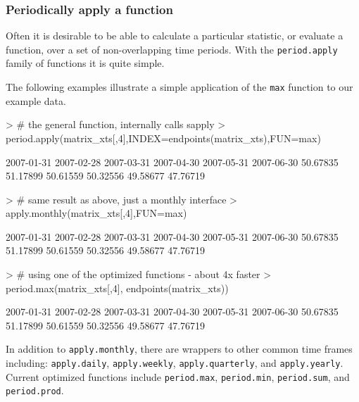 \documentclass{article}
\begin{document}
\subsubsection*{Periodically apply a function}
Often it is desirable to be able to calculate a
particular statistic, or evaluate a function, over
a set of non-overlapping time periods. With the
{\tt period.apply} family of functions
it is quite simple.

The following examples illustrate a
simple application of the {\tt max} function
to our example data.
\begin{Schunk}
\begin{Sinput}
> # the general function, internally calls sapply
> period.apply(matrix_xts[,4],INDEX=endpoints(matrix_xts),FUN=max)
\end{Sinput}
\begin{Soutput}
2007-01-31 2007-02-28 2007-03-31 2007-04-30 2007-05-31 2007-06-30 
  50.67835   51.17899   50.61559   50.32556   49.58677   47.76719 
\end{Soutput}
\end{Schunk}

\begin{Schunk}
\begin{Sinput}
> # same result as above, just a monthly interface
> apply.monthly(matrix_xts[,4],FUN=max)
\end{Sinput}
\begin{Soutput}
2007-01-31 2007-02-28 2007-03-31 2007-04-30 2007-05-31 2007-06-30 
  50.67835   51.17899   50.61559   50.32556   49.58677   47.76719 
\end{Soutput}
\end{Schunk}
 
\begin{Schunk}
\begin{Sinput}
> # using one of the optimized functions - about 4x faster
> period.max(matrix_xts[,4], endpoints(matrix_xts))
\end{Sinput}
\begin{Soutput}
2007-01-31 2007-02-28 2007-03-31 2007-04-30 2007-05-31 2007-06-30 
  50.67835   51.17899   50.61559   50.32556   49.58677   47.76719 
\end{Soutput}
\end{Schunk}

In addition to {\tt apply.monthly}, there are
wrappers to other common time frames including:
{\tt apply.daily}, {\tt apply.weekly}, {\tt apply.quarterly},
and {\tt apply.yearly}.  Current optimized functions
include {\tt period.max}, {\tt period.min}, {\tt period.sum},
and {\tt period.prod}.
\end{document}
